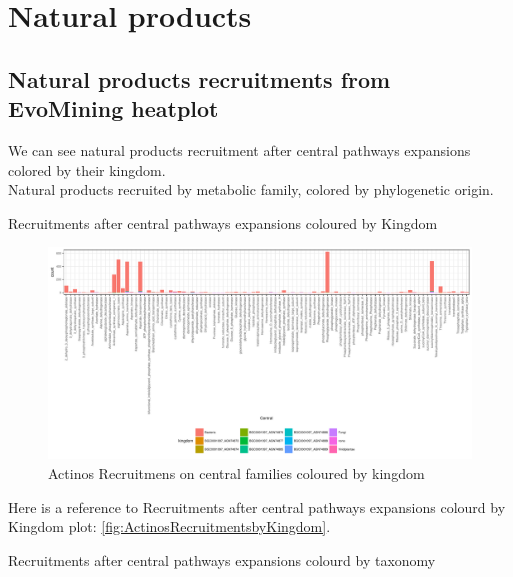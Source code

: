 \documentclass[12pt,twoside]{reedthesis}
\begin{document}
  \section{Natural products}\label{natural-products-1}
  
  \subsection{Natural products recruitments from EvoMining
  heatplot}\label{natural-products-recruitments-from-evomining-heatplot-1}
  
  We can see natural products recruitment after central pathways
  expansions colored by their kingdom.\\
  Natural products recruited by metabolic family, colored by phylogenetic
  origin.
  
  Recruitments after central pathways expansions coloured by Kingdom
  
  \begin{figure}[h!tbp]
  \centering
  \includegraphics[angle = 0,scale = 0.6]{chapter4/ActinosRecruitmentsbyKingdom.pdf}
  \caption[Actinos Recruitmens on central families coloured by kingdom]{\normalsize{Actinos Recruitmens on central families coloured by kingdom}}
  \label{fig:ActinosRecruitmentsbyKingdom}
  \end{figure}
  
  Here is a reference to Recruitments after central pathways expansions
  colourd by Kingdom plot: \autoref{fig:ActinosRecruitmentsbyKingdom}.
  
  \clearpage 
  Recruitments after central pathways expansions colourd by taxonomy
  
\end{document}
